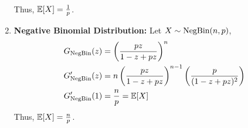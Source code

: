 \begin{solution}
\begin{enumerate}
\begin{align}
		      \end{align}
		      Thus, $\mathbb{E}[X] = \frac{1}{p}$.
		\item \textbf{Negative Binomial Distribution:} Let $X\sim\text{NegBin}(n,p)$,
		      \begin{align}
			      G_{\text{NegBin}}(z)  & = \left( \frac{pz}{1-z+pz} \right)^n \\
			      G'_{\text{NegBin}}(z) & = n\left( \frac{pz}{1-z+pz}
			      \right)^{n-1}\left(\frac{p}{(1-z+pz)^2}\right)       \\
			      G'_{\text{NegBin}}(1) & = \frac{n}{p} = \mathbb{E}[X]
		      \end{align}
		      Thus, $\mathbb{E}[X] = \frac{n}{p}$.
	\end{enumerate}

\end{solution}
